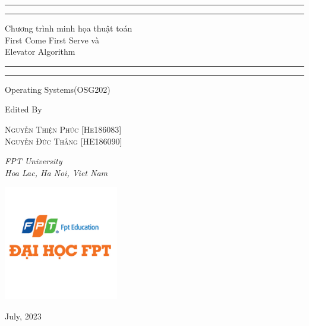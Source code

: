 \documentclass{report}
\begin{document}
 

\begin{titlepage}

	\centering %
	\scshape %
	\vspace*{\baselineskip} 
	\rule{\textwidth}{1.6pt}\vspace*{-\baselineskip}\vspace*{2pt} %
	\rule{\textwidth}{0.4pt} %
	
	\vspace{0.75\baselineskip} 
	
	{\LARGE Chương trình minh họa thuật toán\\ First Come First Serve và\\ Elevator Algorithm\\} %
	
	\vspace{0.75\baselineskip} %
	
	\rule{\textwidth}{0.4pt}\vspace*{-\baselineskip}\vspace{3.2pt} %
	\rule{\textwidth}{1.6pt} %
	
	\vspace{2\baselineskip} 
	
		Operating Systems(OSG202) %
	
	\vspace*{3\baselineskip} %
	Edited By
	
	\vspace{0.5\baselineskip} %
	
	{\scshape\Large Nguyễn Thiện Phúc [He186083] \\ Nguyễn Đức Thắng [HE186090] \\} %
	
	\vspace{0.5\baselineskip} %
	
	\textit{FPT University\\ Hoa Lac, Ha Noi, Viet Nam} %
         \begin{center}
             \includegraphics[width = 5cm]{images/FPTUCT.png}
         \end{center}
	\vfill 
	\vspace{0.3\baselineskip}
	
	July, 2023 %
	

\end{titlepage}
\end{document}
